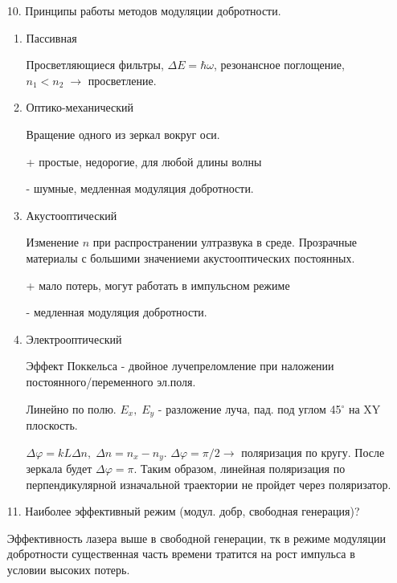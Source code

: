 \documentclass[a4paper]{article}
\begin{document}
\begin{itemize}
	\item[10.] Принципы работы методов модуляции добротности. \par 
		\begin{enumerate}
			\item Пассивная \par 
				Просветляющиеся фильтры, $\Delta E = \hbar \omega$, резонансное поглощение, $n_1<n_2\; \rightarrow$ просветление.
			\item Оптико-механический  \par 
				Вращение одного из зеркал вокруг оси. \par 
				+ простые, недорогие, для любой длины волны \par 
				- шумные, медленная модуляция добротности.
			\item Акустооптический \par 
				Изменение $n$ при распространении ултразвука в среде. Прозрачные материалы с большими значениеми
				акустооптических постоянных. \par 
				+ мало потерь, могут работать в импульсном режиме \par 
				- медленная модуляция добротности.
			\item Электрооптический \par 
				Эффект Поккельса - двойное лучепреломление при наложении постоянного/переменного эл.поля. \par 
				Линейно по полю. $E_x,\; E_y$ - разложение луча, пад. под углом 45$^{\circ}$ на XY плоскость. \par 
				$\Delta \varphi = k L \Delta n, \; \Delta n = n_x - n_y$. $\Delta \varphi= \pi/2 \rightarrow $ поляризация по кругу. После зеркала будет $\Delta \varphi = \pi$. Таким образом,
				линейная поляризация по перпендикулярной изначальной траектории не пройдет через поляризатор.
		\end{enumerate}

	\item[11.] Наиболее эффективный режим (модул. добр, свободная генерация)? \par 
		Эффективность лазера выше в свободной генерации, тк в режиме модуляции добротности существенная часть времени тратится на рост импульса в условии высоких потерь.

\end{itemize}
\end{document}
